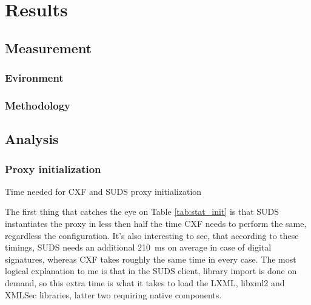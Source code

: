 \chapter{Results}

\section{Measurement}

\subsection{Evironment}


\subsection{Methodology}


\section{Analysis}

\subsection{Proxy initialization}

\begin{table}[htbp]
 \begin{center}
  
  \caption{Time needed for CXF and SUDS proxy initialization}
  \label{tab:stat_init}
 \end{center}
\end{table}

\noindent
The first thing that catches the eye on Table \ref{tab:stat_init} is that SUDS instantiates the proxy in less then half the time CXF needs to perform the same, regardless the configuration. It's also interesting to see, that according to these timings, SUDS needs an additional \mbox{210 ms} on average in case of digital signatures, whereas CXF takes roughly the same time in every case. The most logical explanation to me is that in the SUDS client, library import is done on demand, so this extra time is what it takes to load the LXML, libxml2 and XMLSec libraries, latter two requiring native components.

